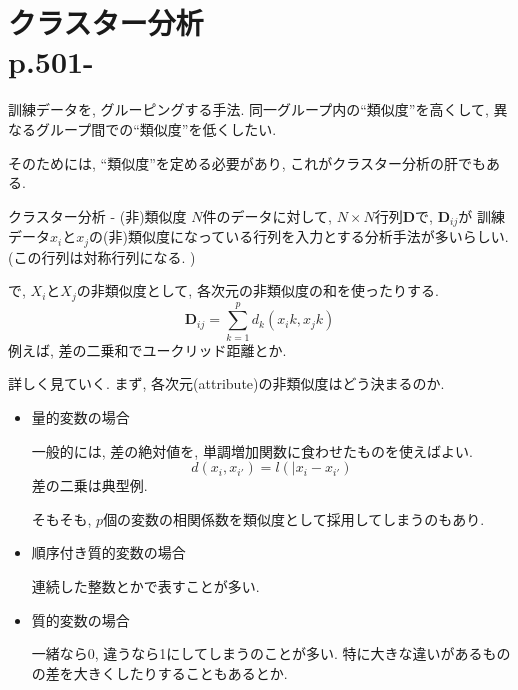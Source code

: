 \documentclass[dvipdfmx,8pt]{beamer}
\begin{document}
  \section{クラスター分析\\p.501-}
  \begin{frame}
    訓練データを, グルーピングする手法.
    同一グループ内の``類似度''を高くして, 異なるグループ間での``類似度''を低くしたい.

    そのためには, ``類似度''を定める必要があり, これがクラスター分析の肝でもある.
  \end{frame}
  \begin{frame}{クラスター分析 - (非)類似度}
    $N$件のデータに対して, $N \times N$行列$\mathbf{D}$で, $\mathbf{D}_{ij}$が
    訓練データ$x_i$と$x_j$の(非)類似度になっている行列を入力とする分析手法が多いらしい.
    (この行列は対称行列になる. )

    で, $X_i$と$X_j$の非類似度として, 各次元の非類似度の和を使ったりする.
    \[
      \mathbf{D}_{ij}=\sum_{k=1}^pd_k(x_ik, x_jk)
    \]
    例えば, 差の二乗和でユークリッド距離とか.

    詳しく見ていく. まず, 各次元(attribute)の非類似度はどう決まるのか.

    \begin{itemize}
      \item 量的変数の場合

      一般的には, 差の絶対値を, 単調増加関数に食わせたものを使えばよい.
      \[
        d(x_i, x_{i'})=l(|x_i-x_{i'})
      \]
      差の二乗は典型例.

      そもそも, $p$個の変数の相関係数を類似度として採用してしまうのもあり.
      \item 順序付き質的変数の場合

      連続した整数とかで表すことが多い.

      \item 質的変数の場合

      一緒なら0, 違うなら1にしてしまうのことが多い.
      特に大きな違いがあるものの差を大きくしたりすることもあるとか.

    \end{itemize}
  \end{frame}
\end{document}
